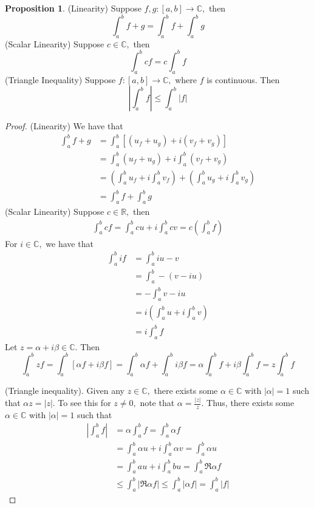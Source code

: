 \documentclass[10pt, oneside]{article}
\newcommand{\bbR}{\mathbb{R}}
\newcommand{\bbC}{\mathbb{C}}
\theoremstyle{definition}
\newtheorem{prop}{Proposition}
\newcommand{\bbC}{\mathbb{C}}
\newcommand{\bbR}{\mathbb{R}}
\begin{document}
\begin{prop}
    (Linearity) Suppose $f, g: [a,b] \to \bbC,$ then 
    \[\int_a^b f + g = \int_a^b f + \int_a^b g\]
    (Scalar Linearity) Suppose $c \in \bbC,$ then 
    \[\int_a^b c f = c\int_a^b f\]
    (Triangle Inequality) Suppose $f: [a,b] \to \bbC,$ where $f$ is continuous. Then 
    \[\left| \int_a^b f\right|\leq \int_a^b |f|\]
\end{prop}
\begin{proof}
    (Linearity) We have that 
    \begin{align*}
        \int_a^b f + g &= \int_a^b \left[(u_f + u_g) + i(v_f + v_g)\right]\\
        &=\int_a^b( u_f + u_g) + i\int_a^b(v_f + v_g)\\ 
        &= (\int_a^b u_f + i \int_a^b v_f) + (\int_a^b u_g + i \int_a^b v_g)\\
        &= \int_a^b f + \int_a^b g
    \end{align*}
    (Scalar Linearity) Suppose $c\in \bbR,$ then
    \begin{align*}
        \int_a^b cf = \int_a^b c u + i\int_a^b c v = c(\int_a^b f)
    \end{align*}
    For $i \in \bbC,$ we have that 
    \begin{align*}
        \int_a^b if &= \int_a^b iu - v\\
        &= \int_a^b-(v - iu)\\
        &= -\int_a^b v - iu\\
        &= i\left(\int_a^b u + i \int_a^b v\right)\\
        &= i \int_a^b f
    \end{align*}
    Let $z = \alpha + i \beta \in \bbC.$ Then 
    \[\int_a^b z f = \int_a^b \left[\alpha f + i\beta f\right] = \int_a^b \alpha f  + \int_a^b i\beta f = \alpha \int_a^b f + i\beta \int_a^b f = z \int_a^b f\]

    (Triangle inequality). Given any $z\in \bbC,$ there exists some $\alpha \in \bbC$ with $|\alpha| = 1$ such that $\alpha z = |z|.$ To see this for $z\neq 0,$ note that $\alpha = \frac{|z|}{z}.$ Thus, there exists some $\alpha \in \bbC$ with $|\alpha| = 1$ such that
    \begin{align*}
        \left|\int_a^b f\right| &= \alpha \int_a^b f = \int_a^b \alpha f\\
        &= \int_a^b \alpha u + i \int_a^b \alpha v= \int_a^b \alpha u\\
        &= \int_a^b au + i\int_a^b bu= \int_a^b \Re{\alpha f}\\
        &\leq \int_a^b |\Re{\alpha f}|
        \leq \int_a^b |\alpha f| = \int_a^b |f|
    \end{align*}
\end{proof}
\end{document}
